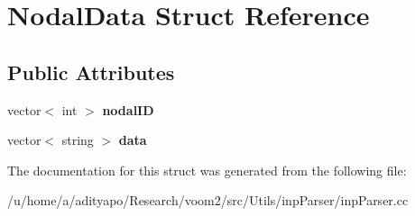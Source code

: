 \hypertarget{struct_nodal_data}{
\section{NodalData Struct Reference}
\label{struct_nodal_data}
}
\subsection*{Public Attributes}
\begin{DoxyCompactItemize}
\item 
\hypertarget{struct_nodal_data_a63f8b2f730e110c222f37356c9954a66}{
vector$<$ int $>$ {\bfseries nodalID}}
\label{struct_nodal_data_a63f8b2f730e110c222f37356c9954a66}

\item 
\hypertarget{struct_nodal_data_afbcf8d70a430b845dcf83c2ba9d04dc7}{
vector$<$ string $>$ {\bfseries data}}
\label{struct_nodal_data_afbcf8d70a430b845dcf83c2ba9d04dc7}

\end{DoxyCompactItemize}


The documentation for this struct was generated from the following file:\begin{DoxyCompactItemize}
\item 
/u/home/a/adityapo/Research/voom2/src/Utils/inpParser/inpParser.cc\end{DoxyCompactItemize}
